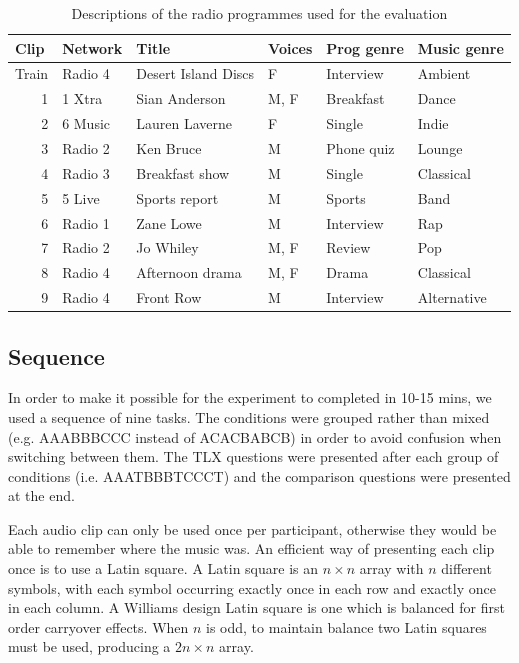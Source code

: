 \begin{table}[htbp]
  \begin{center}
    {\small
    \begin{tabular}{|r|l|l|l|l|l|}
      \hline
      \multicolumn{1}{|l|}{\textbf{Clip}} & \textbf{Network} & \textbf{Title} &
      \textbf{Voices} & \textbf{Prog genre} & \textbf{Music genre} \\ \hline
      Train & Radio 4 & Desert Island Discs & F & Interview & Ambient \\ \hline
      1 & 1 Xtra & Sian Anderson & M, F & Breakfast & Dance \\ \hline
      2 & 6 Music & Lauren Laverne & F & Single & Indie \\ \hline
      3 & Radio 2 & Ken Bruce & M & Phone quiz & Lounge \\ \hline
      4 & Radio 3 & Breakfast show & M & Single & Classical \\ \hline
      5 & 5 Live & Sports report & M & Sports & Band \\ \hline
      6 & Radio 1 & Zane Lowe & M & Interview & Rap \\ \hline
      7 & Radio 2 & Jo Whiley & M, F & Review & Pop \\ \hline
      8 & Radio 4 & Afternoon drama & M, F & Drama & Classical \\ \hline
      9 & Radio 4 & Front Row & M & Interview & Alternative \\ \hline
    \end{tabular}
    }
  \end{center}
  \caption{Descriptions of the radio programmes used for the evaluation}
  \label{tab:clips}
\end{table}

\subsection{Sequence}\label{sec:studysequence}
In order to make it possible for the experiment to completed in 10-15 mins, we used a sequence of nine tasks. The
conditions were grouped rather than mixed (e.g. AAABBBCCC instead of ACACBABCB) in order to avoid confusion when
switching between them. The TLX questions were presented after each group of conditions (i.e. AAATBBBTCCCT) and the
comparison questions were presented at the end.

Each audio clip can only be used once per participant, otherwise they would be able to remember where the music was. An
efficient way of presenting each clip once is to use a Latin square. A Latin square is an $n \times n$ array with $n$
different symbols, with each symbol occurring exactly once in each row and exactly once in each column. A Williams
design Latin square \citep{Williams1949} is one which is balanced for first order carryover effects.  When $n$ is odd,
to maintain balance two Latin squares must be used, producing a $2n \times n$ array.

